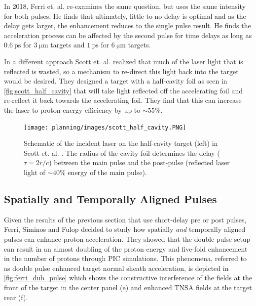 In 2018, Ferri et. al. \cite{Ferri_2018_PoP} re-examines the same question, but uses the same intensity for both pulses. He finds that ultimately, little to no delay is optimal and as the delay gets larger, the enhancement reduces to the single pulse result. He finds the acceleration process can be affected by the second pulse for time delays as long as $\SI{0.6}{\pico \second}$ for $\SI{3}{\micro \meter}$ targets and $\SI{1}{\pico \second}$ for $\SI{6}{\micro \meter}$ targets. 

In a different approach Scott et. al. \cite{Scott_2012_APL} realized that much of the laser light that is reflected is wasted, so a mechanism to re-direct this light back into the target would be desired. They designed a target with a half-cavity foil as seen in \autoref{fig:scott_half_cavity} that will take light reflected off the accelerating foil and re-reflect it back towards the accelerating foil. They find that this can increase the laser to proton energy efficiency by up to $\sim 55 \%$.

\begin{figure}
	\centering 
	\texttt{[image: planning/images/scott\_half\_cavity.PNG]}
	\caption{Schematic of the incident laser on the half-cavity target (left) in Scott et. al. \cite{Scott_2012_APL}. The radius of the cavity foil determines the delay ($\tau = 2 r/c$) between the main pulse and the post-pulse (reflected laser light of $\sim 40 \%$ energy of the main pulse).}
	\label{fig:scott_half_cavity}
\end{figure}

\subsection{Spatially and Temporally Aligned Pulses}

Given the results of the previous section \cite{Markey_2010_PRL,Scott_2012_APL,Ferri_2018_PoP} that use short-delay pre or post pulses, Ferri, Siminos and Fulop decided to study how spatially \emph{and} temporally aligned pulses can enhance proton acceleration. They showed that the double pulse setup can result in an almost doubling of the proton energy and five-fold enhancement in the number of protons \cite{Ferri_2019_Nat_Comm} through \gls{PIC} simulations. This phenomena, referred to as double pulse enhanced target normal sheath acceleration, is depicted in \autoref{fig:ferri_dub_pulse} which shows the constructive interference of the fields at the front of the target in the center panel (e) and enhanced \gls{TNSA} fields at the target rear (f).


